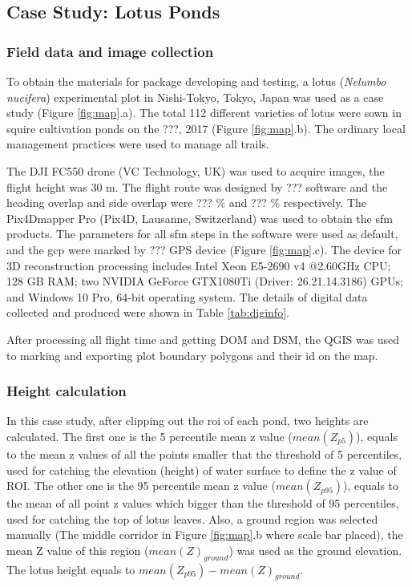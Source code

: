 \documentclass{configs/bmcart}
\begin{document}
\subsection*{Case Study: Lotus Ponds}

\subsubsection*{Field data and image collection}
To obtain the materials for package developing and testing, a lotus (\textit{Nelumbo nucifera}) experimental plot in Nishi-Tokyo, Tokyo, Japan was used as a case study (Figure \ref{fig:map}.a). The total 112 different varieties of lotus were sown in squire cultivation ponds on the ???, 2017 (Figure \ref{fig:map}.b). The ordinary local management practices were used to manage all trails.

The DJI FC550 drone (VC Technology, UK) was used to acquire images, the flight height was 30 m. The flight route was designed by ??? software and the heading overlap and side overlap were ??? \% and ??? \% respectively. The Pix4Dmapper Pro  (Pix4D, Lausanne, Switzerland) was used to obtain the \acrshort*{sfm} products. The parameters for all \acrshort*{sfm} steps in the software were used as default, and the \acrfull*{gcp} were marked by ??? GPS device (Figure \ref{fig:map}.c). The device for 3D reconstruction processing includes Intel Xeon E5-2690 v4 @2.60GHz CPU; 128 GB RAM; two NVIDIA GeForce GTX1080Ti (Driver: 26.21.14.3186) GPUs; and Windows 10 Pro, 64-bit operating system. The details of digital data collected and produced were shown in Table \ref{tab:diginfo}.

After processing all flight time and getting DOM and DSM, the QGIS was used to marking and exporting plot boundary polygons and their id on the map.

\subsubsection*{Height calculation}
In this case study, after clipping out the \acrfull*{roi} of each pond, two heights are calculated. The first one is the 5 percentile mean z value ($mean(Z_{p5})$), equals to the mean z values of all the points smaller that the threshold of 5 percentiles, used for catching the elevation (height) of water surface to define the z value of ROI. The other one is the 95 percentile mean z value ($mean(Z_{p95})$), equals to the mean of all point z values which bigger than the threshold of 95 percentiles, used for catching the top of lotus leaves. Also, a ground region was selected manually (The middle corridor in Figure \ref{fig:map}.b where scale bar placed), the mean Z value of this region ($mean(Z)_{ground}$) was used as the ground elevation. The lotus height equals to $mean(Z_{p95}) - mean(Z)_{ground}$.
\end{document}
